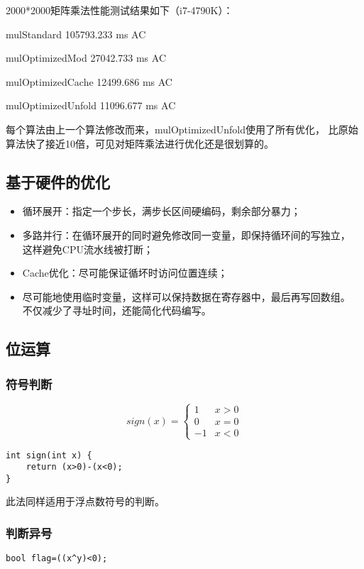 2000*2000矩阵乘法性能测试结果如下（i7-4790K）：

mulStandard 105793.233 ms AC

mulOptimizedMod 27042.733 ms AC

mulOptimizedCache 12499.686 ms AC

mulOptimizedUnfold 11096.677 ms AC

每个算法由上一个算法修改而来，mulOptimizedUnfold使用了所有优化，
比原始算法快了接近10倍，可见对矩阵乘法进行优化还是很划算的。
\subsection{基于硬件的优化}
\begin{itemize}
    \item 循环展开：指定一个步长，满步长区间硬编码，剩余部分暴力；
    \item 多路并行：在循环展开的同时避免修改同一变量，即保持循环间的写独立，
    这样避免CPU流水线被打断；
    \item Cache优化：尽可能保证循坏时访问位置连续；
    \item 尽可能地使用临时变量，这样可以保持数据在寄存器中，最后再写回数组。
    不仅减少了寻址时间，还能简化代码编写。
\end{itemize}
\subsection{位运算}\label{Bitwise}
\subsubsection{符号判断}
\begin{displaymath}
    sign(x)=\left\{\begin{array}{cc}
        1&x>0\\
        0&x=0\\
        -1&x<0
    \end{array}\right.
\end{displaymath}
\begin{lstlisting}
int sign(int x) {
    return (x>0)-(x<0);
}
\end{lstlisting}

此法同样适用于浮点数符号的判断。
\subsubsection{判断异号}
\begin{lstlisting}
bool flag=((x^y)<0);
\end{lstlisting}
